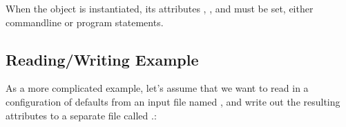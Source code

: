 \documentclass[letterpaper,10pt,english]{sphinxmanual}
\renewcommand{\sphinxcode}[1]{\texttt{\small{#1}}}
\begin{document}
When the \sphinxcode{} object is instantiated, its attributes
\sphinxcode{}, \sphinxcode{}, and \sphinxcode{} must be set,
either  command\sphinxhyphen{}line or  program statements.


\subsection{Reading/Writing Example}
\label{\detokenize{attributes:reading-writing-example}}
As a more complicated example, let’s assume that we want to read in a
configuration of defaults from an input file named \sphinxcode{}, and
write out the resulting attributes to a separate file called
\sphinxcode{}.:
\end{document}
